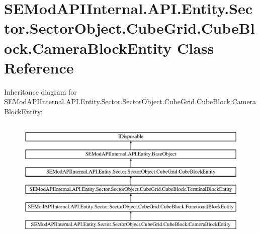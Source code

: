 \hypertarget{class_s_e_mod_a_p_i_internal_1_1_a_p_i_1_1_entity_1_1_sector_1_1_sector_object_1_1_cube_grid_1_1f9cfafaa5312bbae2c6d791b4030f3b9}{}\section{S\+E\+Mod\+A\+P\+I\+Internal.\+A\+P\+I.\+Entity.\+Sector.\+Sector\+Object.\+Cube\+Grid.\+Cube\+Block.\+Camera\+Block\+Entity Class Reference}
\label{class_s_e_mod_a_p_i_internal_1_1_a_p_i_1_1_entity_1_1_sector_1_1_sector_object_1_1_cube_grid_1_1f9cfafaa5312bbae2c6d791b4030f3b9}
Inheritance diagram for S\+E\+Mod\+A\+P\+I\+Internal.\+A\+P\+I.\+Entity.\+Sector.\+Sector\+Object.\+Cube\+Grid.\+Cube\+Block.\+Camera\+Block\+Entity\+:\begin{figure}[H]
\begin{center}
\leavevmode
\includegraphics[height=6.000000cm]{class_s_e_mod_a_p_i_internal_1_1_a_p_i_1_1_entity_1_1_sector_1_1_sector_object_1_1_cube_grid_1_1f9cfafaa5312bbae2c6d791b4030f3b9}
\end{center}
\end{figure}
